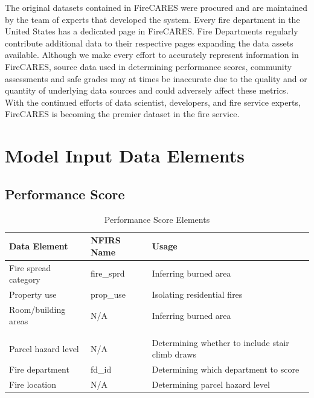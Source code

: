 \documentclass[12pt,oneside]{book}
\begin{document}
The original datasets contained in FireCARES were procured and are maintained by the team of experts that developed the system. Every fire department in the United States has a dedicated page in FireCARES. Fire Departments regularly contribute additional data to their respective pages expanding the data assets available. Although we make every effort to accurately represent information in FireCARES, source data used in determining performance scores, community assessments and safe grades may at times be inaccurate due to the quality and or quantity of underlying data sources and could adversely affect these metrics. With the continued efforts of data scientist, developers, and fire service experts, FireCARES is becoming the premier dataset in the fire service. 

\chapter{Model Input Data Elements}

\section{Performance Score}


\begin{table}[H]
  \centering
  \caption{Performance Score Elements}
  \label{tab:psore_data}
  \begin{tabular}{lll}
    \toprule[1.5pt]
    Data Element          & NFIRS Name      & Usage                         \\
    \midrule
    Fire spread category  & fire\_sprd      & Inferring burned area         \\
    Property use          & prop\_use       & Isolating residential fires   \\
    Room/building areas   & N/A             & Inferring burned area         \\
                          &                 &                               \\
                          &                 &                               \\
    Parcel hazard level   & N/A             & Determining whether to include stair climb draws \\
    Fire department       & fd\_id          & Determining which department to score \\
    Fire location         & N/A             & Determining parcel hazard level \\
    \bottomrule[1.25pt]
  \end{tabular}
  \label{Table:Exp1Interventions}
\end{table}
\end{document}
